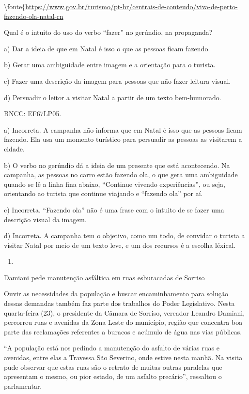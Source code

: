{\textbackslash fonte\{\url{https://www.gov.br/turismo/pt-br/centrais-de-conteudo/viva-de-perto-fazendo-ola-natal-rn}

Qual é o intuito do uso do verbo ``fazer'' no gerúndio, na propaganda?

a) Dar a ideia de que em Natal é isso o que as pessoas ficam fazendo.

b) Gerar uma ambiguidade entre imagem e a orientação para o turista.

c) Fazer uma descrição da imagem para pessoas que não fazer leitura
visual.

d) Persuadir o leitor a visitar Natal a partir de um texto bem-humorado.

BNCC: EF67LP05.

a) Incorreta. A campanha não informa que em Natal é isso que as pessoas
ficam fazendo. Ela usa um momento turístico para persuadir as pessoas as
visitarem a cidade.

b) O verbo no gerúndio dá a ideia de um presente que está acontecendo.
Na campanha, as pessoas no carro estão fazendo ola, o que gera uma
ambiguidade quando se lê a linha fina abaixo, ``Continue vivendo
experiências'', ou seja, orientando ao turista que continue viajando e
``fazendo ola'' por aí.

c) Incorreta. ``Fazendo ola'' não é uma frase com o intuito de se fazer
uma descrição visual da imagem.

d) Incorreta. A campanha tem o objetivo, como um todo, de convidar o
turista a visitar Natal por meio de um texto leve, e um dos recursos é a
escolha léxical.

\begin{enumerate}
\def\labelenumi{\arabic{enumi}.}
\setcounter{enumi}{13}
\tightlist
\item
\end{enumerate}

Damiani pede manutenção asfáltica em ruas esburacadas de Sorriso

Ouvir as necessidades da população e buscar encaminhamento para solução
dessas demandas também faz parte dos trabalhos do Poder Legislativo.
Nesta quarta-feira (23), o presidente da Câmara de Sorriso, vereador
Leandro Damiani, percorreu ruas e avenidas da Zona Leste do município,
região que concentra boa parte das reclamações referentes a buracos e
acúmulo de água nas vias públicas.

``A população está nos pedindo a manutenção do asfalto de várias ruas e
avenidas, entre elas a Travessa São Severino, onde estive nesta manhã.
Na visita pude observar que estas ruas são o retrato de muitas outras
paralelas que apresentam o mesmo, ou pior estado, de um asfalto
precário'', ressaltou o parlamentar.

}
